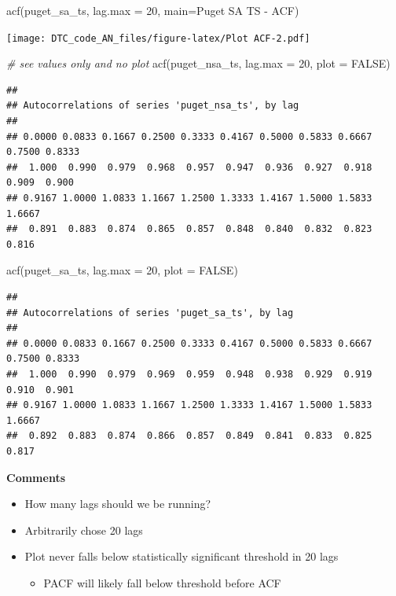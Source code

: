 \documentclass[
]{article}
\newenvironment{Shaded}{\begin{snugshade}}{\end{snugshade}}
\newcommand{\AttributeTok}[1]{\textcolor[rgb]{0.77,0.63,0.00}{#1}}
\newcommand{\CommentTok}[1]{\textcolor[rgb]{0.56,0.35,0.01}{\textit{#1}}}
\newcommand{\ConstantTok}[1]{\textcolor[rgb]{0.00,0.00,0.00}{#1}}
\newcommand{\DecValTok}[1]{\textcolor[rgb]{0.00,0.00,0.81}{#1}}
\newcommand{\FunctionTok}[1]{\textcolor[rgb]{0.00,0.00,0.00}{#1}}
\newcommand{\NormalTok}[1]{#1}
\newcommand{\StringTok}[1]{\textcolor[rgb]{0.31,0.60,0.02}{#1}}
\providecommand{\tightlist}{%
  \setlength{\itemsep}{0pt}\setlength{\parskip}{0pt}}
\begin{document}
\begin{Shaded}
\begin{Highlighting}[]
\FunctionTok{acf}\NormalTok{(puget\_sa\_ts, }\AttributeTok{lag.max =} \DecValTok{20}\NormalTok{, }\AttributeTok{main=}\StringTok{\textquotesingle{}Puget SA TS {-} ACF\textquotesingle{}}\NormalTok{)}
\end{Highlighting}
\end{Shaded}

\texttt{[image: DTC\_code\_AN\_files/figure-latex/Plot ACF-2.pdf]}

\begin{Shaded}
\begin{Highlighting}[]
\CommentTok{\# see values only and no plot}
\FunctionTok{acf}\NormalTok{(puget\_nsa\_ts, }\AttributeTok{lag.max =} \DecValTok{20}\NormalTok{, }\AttributeTok{plot =} \ConstantTok{FALSE}\NormalTok{)}
\end{Highlighting}
\end{Shaded}

\begin{verbatim}
## 
## Autocorrelations of series 'puget_nsa_ts', by lag
## 
## 0.0000 0.0833 0.1667 0.2500 0.3333 0.4167 0.5000 0.5833 0.6667 0.7500 0.8333 
##  1.000  0.990  0.979  0.968  0.957  0.947  0.936  0.927  0.918  0.909  0.900 
## 0.9167 1.0000 1.0833 1.1667 1.2500 1.3333 1.4167 1.5000 1.5833 1.6667 
##  0.891  0.883  0.874  0.865  0.857  0.848  0.840  0.832  0.823  0.816
\end{verbatim}

\begin{Shaded}
\begin{Highlighting}[]
\FunctionTok{acf}\NormalTok{(puget\_sa\_ts, }\AttributeTok{lag.max =} \DecValTok{20}\NormalTok{, }\AttributeTok{plot =} \ConstantTok{FALSE}\NormalTok{)}
\end{Highlighting}
\end{Shaded}

\begin{verbatim}
## 
## Autocorrelations of series 'puget_sa_ts', by lag
## 
## 0.0000 0.0833 0.1667 0.2500 0.3333 0.4167 0.5000 0.5833 0.6667 0.7500 0.8333 
##  1.000  0.990  0.979  0.969  0.959  0.948  0.938  0.929  0.919  0.910  0.901 
## 0.9167 1.0000 1.0833 1.1667 1.2500 1.3333 1.4167 1.5000 1.5833 1.6667 
##  0.892  0.883  0.874  0.866  0.857  0.849  0.841  0.833  0.825  0.817
\end{verbatim}

\textbf{Comments}

\begin{itemize}
\item
  How many lags should we be running?
\item
  Arbitrarily chose 20 lags
\item
  Plot never falls below statistically significant threshold in 20 lags

  \begin{itemize}
  \tightlist
  \item
    PACF will likely fall below threshold before ACF
  \end{itemize}
\end{itemize}
\end{document}
